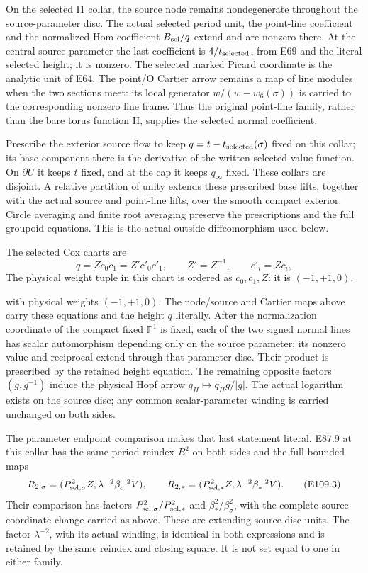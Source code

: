 On the selected I1 collar, the source node remains nondegenerate throughout the source-parameter disc. The actual selected period unit, the point-line coefficient and the normalized Hom coefficient \(B_{\rm sel}/q\) extend and are nonzero there. At the central source parameter the last coefficient is \(4/t_{\rm selected}\), from E69 and the literal selected height; it is nonzero. The selected marked Picard coordinate is the analytic unit of E64. The point/O Cartier arrow remains a map of line modules when the two sections meet: its local generator \(w/(w-w_6(\sigma))\) is carried to the corresponding nonzero line frame. Thus the original point-line family, rather than the bare torus function H, supplies the selected normal coefficient.

Prescribe the exterior source flow to keep \(q=t-t_{\rm selected}(\sigma)\) fixed on this collar; its base component there is the derivative of the written selected-value function. On \(\partial U\) it keeps \(t\) fixed, and at the cap it keeps \(q_\infty\) fixed. These collars are disjoint. A relative partition of unity extends these prescribed base lifts, together with the actual source and point-line lifts, over the smooth compact exterior. Circle averaging and finite root averaging preserve the prescriptions and the full groupoid equations. This is the actual outside diffeomorphism used below.

The selected Cox charts are
\[
 q=Zc_0c_1=Z'c'_0c'_1,\qquad
 Z'=Z^{-1},\qquad c'_i=Zc_i,
 \tag{E109.2}
\]
The physical weight tuple in this chart is ordered as \(c_0,c_1,Z\): it is \((-1,+1,0)\).

with physical weights \((-1,+1,0)\). The node/source and Cartier maps above carry these equations and the height \(q\) literally. After the normalization coordinate of the compact fixed \(\mathbb P^1\) is fixed, each of the two signed normal lines has scalar automorphism depending only on the source parameter; its nonzero value and reciprocal extend through that parameter disc. Their product is prescribed by the retained height equation. The remaining opposite factors \((g,g^{-1})\) induce the physical Hopf arrow \(q_H\mapsto q_Hg/|g|\). The actual logarithm exists on the source disc; any common scalar-parameter winding is carried unchanged on both sides.

The parameter endpoint comparison makes that last statement literal. E87.9 at this collar has the same period reindex \(B^2\) on both sides and the full bounded maps
\[
 R_{2,\sigma}=(P_{{\rm sel},\sigma}^2Z,
                    \lambda^{-2}\beta_\sigma^{-2}V),\qquad
 R_{2,*}=(P_{{\rm sel},*}^2Z,
                    \lambda^{-2}\beta_*^{-2}V).
 \tag{E109.3}
\]
Their comparison has factors \(P_{{\rm sel},\sigma}^2/P_{{\rm sel},*}^2\) and \(\beta_*^2/\beta_\sigma^2\), with the complete source-coordinate change carried as above. These are extending source-disc units. The factor \(\lambda^{-2}\), with its actual winding, is identical in both expressions and is retained by the same reindex and closing square. It is not set equal to one in either family.

